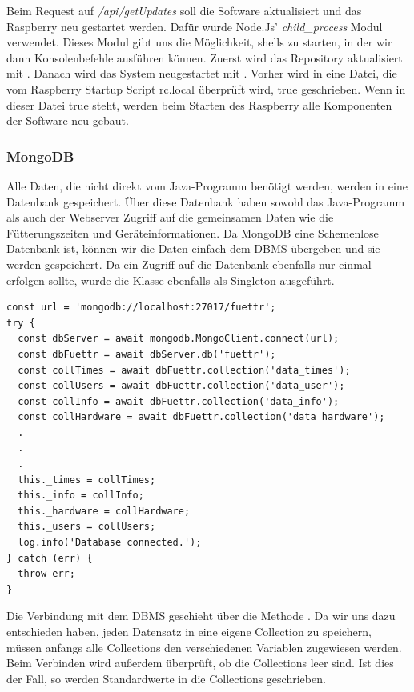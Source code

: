 Beim Request auf \textit{/api/getUpdates} soll die Software aktualisiert und das Raspberry neu gestartet werden. Dafür wurde Node.Js' \textit{child\_process} Modul verwendet. Dieses Modul gibt uns die Möglichkeit, shells zu starten, in der wir dann Konsolenbefehle ausführen können. Zuerst wird das Repository aktualisiert mit . Danach wird das System neugestartet mit . Vorher wird in eine Datei, die vom Raspberry Startup Script rc.local überprüft wird, true geschrieben. Wenn in dieser Datei true steht, werden beim Starten des Raspberry alle Komponenten der Software neu gebaut.

\subsubsection{MongoDB}
\label{sec:ums-server-mongo}
Alle Daten, die nicht direkt vom Java-Programm benötigt werden, werden in eine Datenbank gespeichert. Über diese Datenbank haben sowohl das Java-Programm als auch der Webserver Zugriff auf die gemeinsamen Daten wie die Fütterungszeiten und Geräteinformationen. Da MongoDB eine Schemenlose Datenbank ist, können wir die Daten einfach dem \ac{DBMS} übergeben und sie werden gespeichert. Da ein Zugriff auf die Datenbank ebenfalls nur einmal erfolgen sollte, wurde die Klasse ebenfalls als Singleton ausgeführt. 

\begin{lstlisting}[caption=Verbindung mit der Datenbank,style=TS,label=database-connection]
const url = 'mongodb://localhost:27017/fuettr';
try {
  const dbServer = await mongodb.MongoClient.connect(url);
  const dbFuettr = await dbServer.db('fuettr');
  const collTimes = await dbFuettr.collection('data_times');
  const collUsers = await dbFuettr.collection('data_user');
  const collInfo = await dbFuettr.collection('data_info');
  const collHardware = await dbFuettr.collection('data_hardware');
  .
  .
  .
  this._times = collTimes;
  this._info = collInfo;
  this._hardware = collHardware;
  this._users = collUsers;
  log.info('Database connected.');
} catch (err) {
  throw err;
}
\end{lstlisting}

Die Verbindung mit dem \ac{DBMS} geschieht über die Methode . Da wir uns dazu entschieden haben, jeden Datensatz in eine eigene Collection zu speichern, müssen anfangs alle Collections den verschiedenen Variablen zugewiesen werden. Beim Verbinden wird außerdem überprüft, ob die Collections leer sind. Ist dies der Fall, so werden Standardwerte in die Collections geschrieben. \\\\

